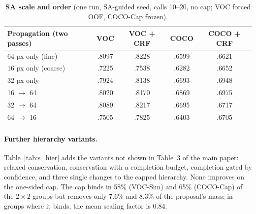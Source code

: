 \documentclass[10pt,twocolumn,letterpaper]{article}
\begin{document}
\begin{table}[t]
\centering
\footnotesize\setlength{\tabcolsep}{3pt}
\begin{tabular}{@{}lcccc@{}}
\toprule
Propagation (two passes) & VOC & VOC + CRF & COCO & COCO + CRF \\
\midrule
64 px only (fine) & .8097 & .8228 & .6599 & .6621 \\
16 px only (coarse) & .7225 & .7538 & .6282 & .6652 \\
32 px only & .7924 & .8138 & .6693 & .6948 \\
16 $\rightarrow$ 64 & .8020 & .8170 & .6869 & .6975 \\
32 $\rightarrow$ 64 & .8089 & .8217 & .6695 & .6717 \\
64 $\rightarrow$ 16 & .7505 & .7825 & .6403 & .6705 \\
\bottomrule
\end{tabular}
\caption{\textbf{SA scale and order} (one run, SA-guided seed, calls 10--20, no cap; VOC forced OOF, COCO-Cap frozen).}
\label{tab:s_scales}
\end{table}

\paragraph{Further hierarchy variants.}
Table~\ref{tab:s_hier} adds the variants not shown in Table~3 of the main paper: relaxed conservation, conservation with a completion budget, completion gated by confidence, and three single changes to the capped hierarchy. None improves on the one-sided cap. The cap binds in 58\% (VOC-Sim) and 65\% (COCO-Cap) of the $2\times2$ groups but removes only 7.6\% and 8.3\% of the proposal's mass; in groups where it binds, the mean scaling factor is 0.84.
\end{document}

